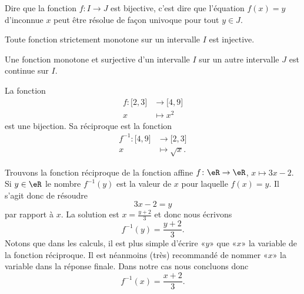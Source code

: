 \begin{remark}
    Dire que la fonction \( f\colon I\to J\) est bijective, c'est dire que l'équation \( f(x)=y\) d'inconnue \( x\) peut être résolue de façon univoque pour tout \( y\in J\).
\end{remark}

\begin{remark}
  Toute fonction strictement monotone sur un intervalle $I$ est injective. 
\end{remark}

\begin{proposition} \label{PropOARooUuCaYT}
    Une fonction monotone et surjective d'un intervalle $I$ sur un autre intervalle $J$ est continue sur $I$.
\end{proposition}

\begin{example}
    La fonction
    \begin{equation}
        \begin{aligned}
            f\colon \mathopen[ 2 , 3 \mathclose]&\to \mathopen[ 4 , 9 \mathclose] \\
            x&\mapsto x^2 
        \end{aligned}
    \end{equation}
    est une bijection. Sa réciproque est la fonction
    \begin{equation}
        \begin{aligned}
            f^{-1}\colon \mathopen[ 4 , 9 \mathclose]&\to \mathopen[ 2 , 3 \mathclose] \\
            x&\mapsto \sqrt{x}. 
        \end{aligned}
    \end{equation}
\end{example}

\begin{example}
    Trouvons la fonction réciproque de la fonction affine \( f\colon \eR\to \eR\), \( x\mapsto 3x-2\). Si \( y\in \eR\) le nombre \( f^{-1}(y)\) est la valeur de \( x\) pour laquelle \( f(x)=y\). Il s'agit donc de résoudre
    \begin{equation}
        3x-2=y
    \end{equation}
    par rapport à \( x\). La solution est \( x=\frac{ y+2 }{ 3 }\) et donc nous écrivons
    \begin{equation}
        f^{-1}(y)=\frac{ y+2 }{ 3 }.
    \end{equation}
    Notons que dans les calculs, il est plus simple d'écrire «\( y\)» que «\( x\)» la variable de la fonction réciproque. Il est néanmoins (très) recommandé de nommer «\( x\)» la variable dans la réponse finale. Dans notre cas nous concluons donc
    \begin{equation}
        f^{-1}(x)=\frac{ x+2 }{ 3 }.
    \end{equation}
\end{example}

